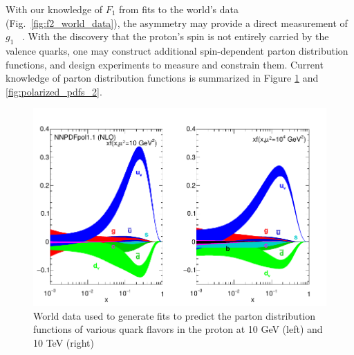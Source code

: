 {\noindent}With our knowledge of $F_1$ from fits to the world's data
(Fig.~\ref{fig:f2_world_data}), the asymmetry may provide a direct measurement
of $g_1$ ~\cite{DeFlorian2009}. With the discovery that the proton's spin is not
entirely carried by the valence quarks, one may construct additional
spin-dependent parton distribution functions, and design experiments to measure
and constrain them. Current knowledge of parton distribution functions is
summarized in Figure \ref{fig:polarized_pdfs_1} and \ref{fig:polarized_pdfs_2}.

\begin{figure}[ht]
  \centering
  \includegraphics[width=0.7\linewidth]{./figures/polarized_pdfs.pdf}
  \caption{
    World data used to generate fits to predict the parton distribution
    functions of various quark flavors in the proton at 10 GeV (left) and 10
    TeV (right)~\cite{ReviewEidelman2012}
  }
  \label{fig:polarized_pdfs_1}
\end{figure}

